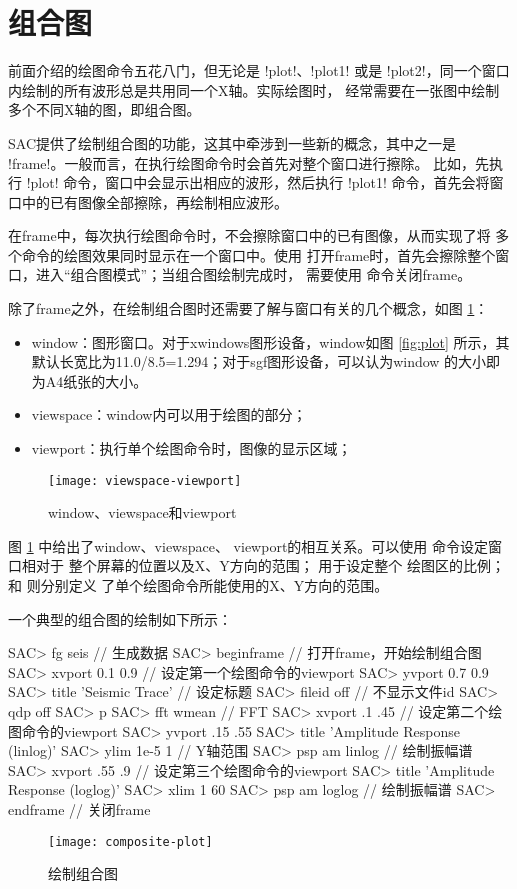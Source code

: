\section{组合图}
\label{sec:composite-plots}

前面介绍的绘图命令五花八门，但无论是 !plot!、!plot1! 或是
!plot2!，同一个窗口内绘制的所有波形总是共用同一个X轴。实际绘图时，
经常需要在一张图中绘制多个不同X轴的图，即组合图。

SAC提供了绘制组合图的功能，这其中牵涉到一些新的概念，其中之一是
!frame!。一般而言，在执行绘图命令时会首先对整个窗口进行擦除。
比如，先执行 !plot! 命令，窗口中会显示出相应的波形，然后执行
!plot1! 命令，首先会将窗口中的已有图像全部擦除，再绘制相应波形。

在frame中，每次执行绘图命令时，不会擦除窗口中的已有图像，从而实现了将
多个命令的绘图效果同时显示在一个窗口中。使用 
打开frame时，首先会擦除整个窗口，进入``组合图模式''；当组合图绘制完成时，
需要使用  命令关闭frame。

除了frame之外，在绘制组合图时还需要了解与窗口有关的几个概念，如图
\ref{fig:window-viewspace-viewport}：
\begin{itemize}
\item window：图形窗口。对于xwindows图形设备，window如图 \ref{fig:plot}
    所示，其默认长宽比为11.0/8.5=1.294；对于sgf图形设备，可以认为window
    的大小即为A4纸张的大小。
\item viewspace：window内可以用于绘图的部分；
\item viewport：执行单个绘图命令时，图像的显示区域；
\end{itemize}

\begin{figure}[H]
\centering
\texttt{[image: viewspace-viewport]}
\caption{window、viewspace和viewport}
\label{fig:window-viewspace-viewport}
\end{figure}

图 \ref{fig:window-viewspace-viewport} 中给出了window、viewspace、
viewport的相互关系。可以使用  命令设定窗口相对于
整个屏幕的位置以及X、Y方向的范围； 用于设定整个
绘图区的比例； 和  则分别定义
了单个绘图命令所能使用的X、Y方向的范围。

一个典型的组合图的绘制如下所示：
\begin{SACCode}
SAC> fg seis                        // 生成数据
SAC> beginframe                     // 打开frame，开始绘制组合图
SAC> xvport 0.1 0.9                 // 设定第一个绘图命令的viewport
SAC> yvport 0.7 0.9
SAC> title 'Seismic Trace'          // 设定标题
SAC> fileid off                     // 不显示文件id
SAC> qdp off
SAC> p
SAC> fft wmean                      // FFT
SAC> xvport .1 .45                  // 设定第二个绘图命令的viewport
SAC> yvport .15 .55
SAC> title 'Amplitude Response (linlog)'
SAC> ylim 1e-5 1                    // Y轴范围
SAC> psp am linlog                  // 绘制振幅谱
SAC> xvport .55 .9                  // 设定第三个绘图命令的viewport
SAC> title 'Amplitude Response (loglog)'
SAC> xlim 1 60
SAC> psp am loglog                  // 绘制振幅谱
SAC> endframe                       // 关闭frame
\end{SACCode}

\begin{figure}[H]
\centering
\texttt{[image: composite-plot]}
\caption{绘制组合图}
\label{fig:composite-plot}
\end{figure}
